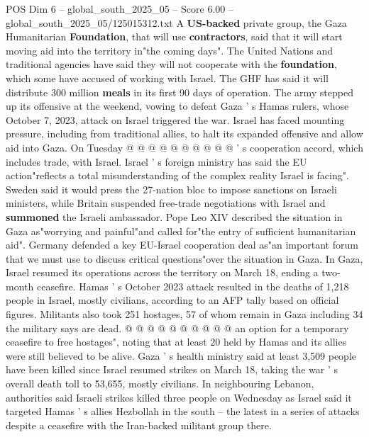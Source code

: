 \begin{textsample}{POS Dim 6 – global\_south\_2025\_05 – Score 6.00 – global\_south\_2025\_05/125015312.txt}
A \textbf{US-backed} private group, the Gaza Humanitarian \textbf{Foundation}, that will use \textbf{contractors}, said that it will start moving aid into the territory in"the coming days".
The United Nations and traditional agencies have said they will not cooperate with the \textbf{foundation}, which some have accused of working with Israel.
The GHF has said it will distribute 300 million \textbf{meals} in its first 90 days of operation.
The army stepped up its offensive at the weekend, vowing to defeat Gaza ' s Hamas rulers, whose October 7, 2023, attack on Israel triggered the war.
Israel has faced mounting pressure, including from traditional allies, to halt its expanded offensive and allow aid into Gaza.
On Tuesday @ @ @ @ @ @ @ @ @ @ ' s cooperation accord, which includes trade, with Israel.
Israel ' s foreign ministry has said the EU action"reflects a total misunderstanding of the complex reality Israel is facing".
Sweden said it would press the 27-nation bloc to impose sanctions on Israeli ministers, while Britain suspended free-trade negotiations with Israel and \textbf{summoned} the Israeli ambassador.
Pope Leo XIV described the situation in Gaza as"worrying and painful"and called for"the entry of sufficient humanitarian aid".
Germany defended a key EU-Israel cooperation deal as"an important forum that we must use to discuss critical questions"over the situation in Gaza.
In Gaza, Israel resumed its operations across the territory on March 18, ending a two-month ceasefire.
Hamas ' s October 2023 attack resulted in the deaths of 1,218 people in Israel, mostly civilians, according to an AFP tally based on official figures.
Militants also took 251 hostages, 57 of whom remain in Gaza including 34 the military says are dead. @ @ @ @ @ @ @ @ @ @ an option for a temporary ceasefire to free hostages", noting that at least 20 held by Hamas and its allies were still believed to be alive.
Gaza ' s health ministry said at least 3,509 people have been killed since Israel resumed strikes on March 18, taking the war ' s overall death toll to 53,655, mostly civilians.
In neighbouring Lebanon, authorities said Israeli strikes killed three people on Wednesday as Israel said it targeted Hamas ' s allies Hezbollah in the south -- the latest in a series of attacks despite a ceasefire with the Iran-backed militant group there.

\end{textsample}
